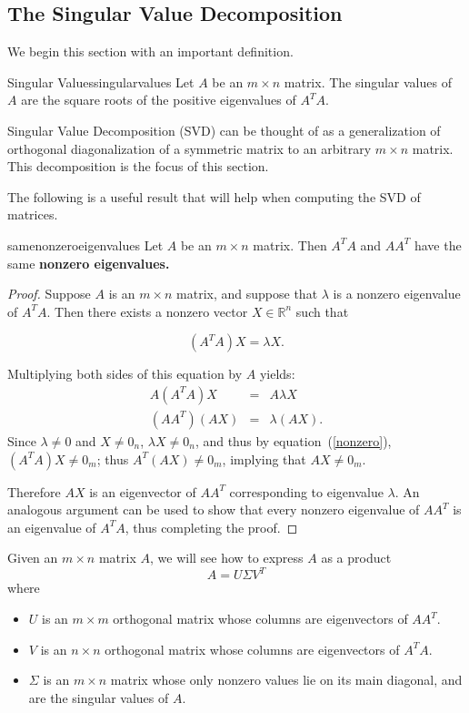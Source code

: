 \subsection{The Singular Value Decomposition}

We begin this section with an important definition.

\begin{definition}{Singular Values}{singularvalues}
Let $A$ be an $m\times n$ matrix. The singular values of $A$ are the square roots of the positive
eigenvalues of $A^TA.$ 
\end{definition}

Singular Value Decomposition (SVD) can be thought of as 
a generalization of orthogonal diagonalization of a symmetric matrix
to an arbitrary $m\times n$ matrix. This decomposition is the focus of this section. 

The following is a useful result that will help when computing the SVD of matrices.

\begin{proposition}{}{samenonzeroeigenvalues}
Let $A$ be an $m \times n$ matrix. Then $A^TA$ and $AA^T$ have the same \bf{nonzero} eigenvalues.
\end{proposition}

\begin{proof}
Suppose $A$ is an $m\times n$ matrix, and suppose that  $\lambda$ is a nonzero eigenvalue of $A^TA$.
Then there exists a nonzero vector $X\in \mathbb{R}^n$ such that

\begin{equation}\label{nonzero}
(A^TA)X=\lambda X.
\end{equation}

Multiplying both sides of this equation by $A$ yields:
\begin{eqnarray*}
A(A^TA)X & = & A\lambda X\\
(AA^T)(AX) & = & \lambda (AX).
\end{eqnarray*}
Since $\lambda\neq 0$ and $X\neq 0_n$, $\lambda X\neq 0_n$,
and thus by equation~(\ref{nonzero}),
$(A^TA)X\neq 0_m$; thus $A^T(AX)\neq 0_m$, 
implying that $AX\neq 0_m$.

Therefore $AX$ is an eigenvector of $AA^T$ corresponding to eigenvalue
$\lambda$.  An analogous argument can be used to show that every
nonzero eigenvalue of $AA^T$ is an eigenvalue of $A^TA$, thus
completing the proof.
\end{proof}

Given an $m\times n$ matrix $A$, we will see how to express $A$ as a product
\[ A=U\Sigma V^T\]
where
\begin{itemize}
\item $U$ is an $m\times m$ orthogonal matrix whose columns are
eigenvectors of $AA^T$.
\item $V$ is an $n\times n$ orthogonal matrix whose columns are
eigenvectors of $A^TA$.
\item $\Sigma$ is an $m\times n$ matrix whose only nonzero values
lie on its main diagonal, and are the singular values of $A$.
\end{itemize}

